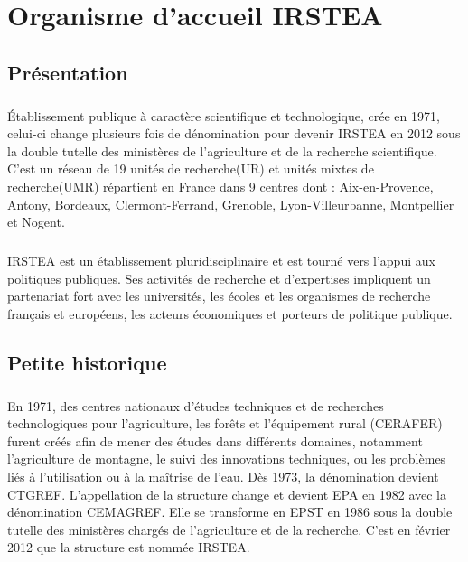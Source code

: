 \chapter{Organisme d’accueil IRSTEA}
\section{Présentation}
\paragraph{}
Établissement publique à caractère scientifique et technologique, crée en 1971, celui-ci change plusieurs fois de dénomination pour devenir \gls{IRSTEA}  en 2012 sous la double tutelle des ministères de l’agriculture et de la recherche scientifique. C’est  un réseau de 19 unités de recherche(UR) et unités mixtes de recherche(UMR)  répartient en France dans 9 centres dont : Aix-en-Provence, Antony, Bordeaux, Clermont-Ferrand, Grenoble, Lyon-Villeurbanne, Montpellier et Nogent. 
\paragraph{}
IRSTEA est un établissement pluridisciplinaire et est tourné vers l’appui aux politiques publiques. Ses activités de recherche et d’expertises impliquent un partenariat fort avec les universités, les écoles et les organismes de recherche français et européens, les acteurs économiques et porteurs de politique publique. 

\section{Petite historique}
\paragraph{}	
En 1971, des centres nationaux d’études techniques et de recherches technologiques pour l’agriculture, les forêts et l’équipement rural (CERAFER) furent créés afin de mener des études dans différents domaines, notamment l’agriculture de montagne, le suivi des innovations techniques, ou les problèmes liés à l’utilisation ou à la maîtrise de l’eau. Dès 1973, la dénomination devient \gls{CTGREF}.
\newline
L’appellation de la structure change et devient \gls{EPA} en 1982 avec la dénomination \gls{CEMAGREF}. Elle se transforme  en \gls{EPST} en 1986 sous la double tutelle des ministères chargés de l’agriculture et de la recherche. C’est en février 2012 que la structure est nommée \gls{IRSTEA}.


